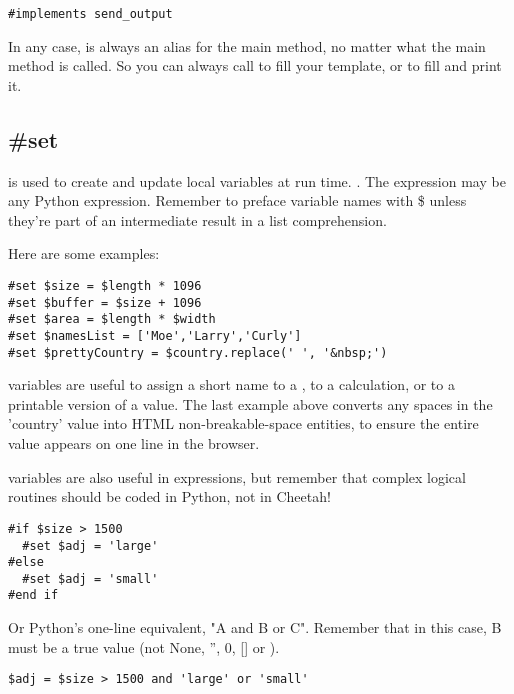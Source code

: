 
\begin{verbatim}
#implements send_output
\end{verbatim}

In any case,  is always an alias for the main method, no
matter what the main method is called.  So you can always call  to
fill your template, or  to fill and print it.  



\subsection{\#set}
\label{inheritanceEtc.set}

 is used to create and update local variables at run time.
. The expression may be any Python expression.
Remember to preface variable names with \$ unless they're part of an
intermediate result in a list comprehension.

Here are some examples:
\begin{verbatim}
#set $size = $length * 1096
#set $buffer = $size + 1096
#set $area = $length * $width
#set $namesList = ['Moe','Larry','Curly']
#set $prettyCountry = $country.replace(' ', '&nbsp;')
\end{verbatim}

 variables are useful to assign a short name to a
, to a calculation, or to a printable version of
a value.  The last example above converts any spaces in the 'country' value
into HTML non-breakable-space entities, to ensure the entire value appears on
one line in the browser.

 variables are also useful in  expressions, but
remember that complex logical routines should be coded in Python, not in
Cheetah!
\begin{verbatim}
#if $size > 1500
  #set $adj = 'large'
#else
  #set $adj = 'small'
#end if
\end{verbatim}
Or Python's one-line equivalent, "A and B or C".  Remember that in this case,
B must be a true value (not None, '', 0, [] or {}).  
\begin{verbatim}
$adj = $size > 1500 and 'large' or 'small'
\end{verbatim}

